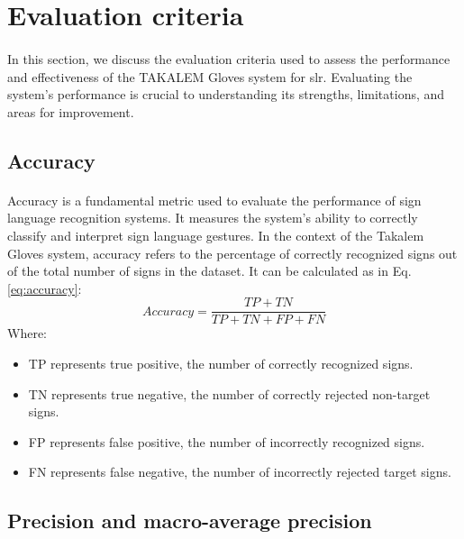 \section{Evaluation criteria}
\paragraph{}
In this section, we discuss the evaluation criteria used to assess the performance and effectiveness of the TAKALEM Gloves system for \ac{slr}. Evaluating the system's performance is crucial to understanding its strengths, limitations, and areas for improvement.
\subsection{Accuracy}
\paragraph{}
Accuracy is a fundamental metric used to evaluate the performance of sign language recognition systems. It measures the system's ability to correctly classify and interpret sign language gestures. In the context of the Takalem Gloves system, accuracy refers to the percentage of correctly recognized signs out of the total number of signs in the dataset. It can be calculated as in Eq. \ref{eq:accuracy}:
\begin{equation}
	Accuracy = \frac{TP + TN}{TP + TN + FP + FN} \label{eq:accuracy}
\end{equation}
Where:
\begin{itemize}
	\item TP represents true positive, the number of correctly recognized signs.
	\item TN represents true negative, the number of correctly rejected non-target signs.
	\item FP represents false positive, the number of incorrectly recognized signs.
	\item FN represents false negative, the number of incorrectly rejected target signs.
\end{itemize}
\subsection{Precision and macro-average precision}
